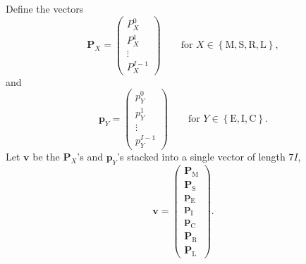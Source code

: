 \documentclass{article}
\renewcommand{\vec}[1]{\mathbf{#1}}
\begin{document}
Define the vectors
\begin{equation}
  \vec{P}_X =
  \begin{pmatrix}
    P_X^0\\
    P_X^1\\
    \vdots\\
    P_X^{I - 1}
  \end{pmatrix}
  \qquad
  \text{for $X \in
    \left\{\mathrm{M}, \mathrm{S}, \mathrm{R}, \mathrm{L}\right\}$},
\end{equation}
and
\begin{equation}
  \vec{p}_Y =
  \begin{pmatrix}
    p_Y^0\\
    p_Y^1\\
    \vdots\\
    p_Y^{I - 1}
  \end{pmatrix}
  \qquad
  \text{for $Y \in
    \left\{\mathrm{E}, \mathrm{I}, \mathrm{C}\right\}$}.
\end{equation}
Let $\vec{v}$ be the $\vec{P}_X$'s and $\vec{p}_Y$'s stacked into a
single vector of length $7 I$,
\begin{equation}
  \vec{v} =
  \begin{pmatrix}
    \vec{P}_{\mathrm{M}}\\
    \vec{P}_{\mathrm{S}}\\
    \vec{p}_{\mathrm{E}}\\
    \vec{p}_{\mathrm{I}}\\
    \vec{p}_{\mathrm{C}}\\
    \vec{P}_{\mathrm{R}}\\
    \vec{P}_{\mathrm{L}}
  \end{pmatrix}.
\end{equation}
\end{document}
